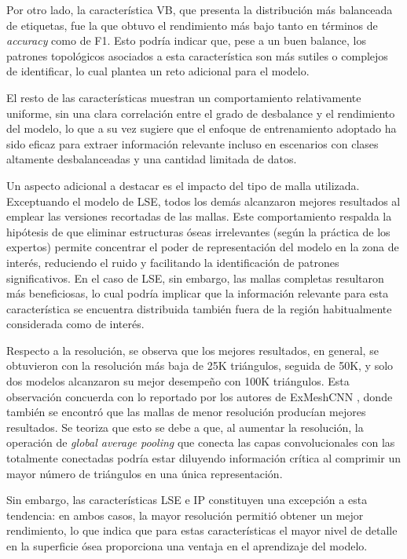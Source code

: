 Por otro lado, la característica VB, que presenta la distribución más balanceada de etiquetas, fue la que obtuvo el rendimiento más bajo tanto en términos de \textit{accuracy} como de F1. Esto podría indicar que, pese a un buen balance, los patrones topológicos asociados a esta característica son más sutiles o complejos de identificar, lo cual plantea un reto adicional para el modelo.

El resto de las características muestran un comportamiento relativamente uniforme, sin una clara correlación entre el grado de desbalance y el rendimiento del modelo, lo que a su vez sugiere que el enfoque de entrenamiento adoptado ha sido eficaz para extraer información relevante incluso en escenarios con clases altamente desbalanceadas y una cantidad limitada de datos.

Un aspecto adicional a destacar es el impacto del tipo de malla utilizada. Exceptuando el modelo de LSE, todos los demás alcanzaron mejores resultados al emplear las versiones recortadas de las mallas. Este comportamiento respalda la hipótesis de que eliminar estructuras óseas irrelevantes (según la práctica de los expertos) permite concentrar el poder de representación del modelo en la zona de interés, reduciendo el ruido y facilitando la identificación de patrones significativos. En el caso de LSE, sin embargo, las mallas completas resultaron más beneficiosas, lo cual podría implicar que la información relevante para esta característica se encuentra distribuida también fuera de la región habitualmente considerada como de interés.

Respecto a la resolución, se observa que los mejores resultados, en general, se obtuvieron con la resolución más baja de 25K triángulos, seguida de 50K, y solo dos modelos alcanzaron su mejor desempeño con 100K triángulos. Esta observación concuerda con lo reportado por los autores de ExMeshCNN \cite{kim_exmeshcnn_2022}, donde también se encontró que las mallas de menor resolución producían mejores resultados. Se teoriza que esto se debe a que, al aumentar la resolución, la operación de \textit{global average pooling} que conecta las capas convolucionales con las totalmente conectadas podría estar diluyendo información crítica al comprimir un mayor número de triángulos en una única representación.

Sin embargo, las características LSE e IP constituyen una excepción a esta tendencia: en ambos casos, la mayor resolución permitió obtener un mejor rendimiento, lo que indica que para estas características el mayor nivel de detalle en la superficie ósea proporciona una ventaja en el aprendizaje del modelo.

